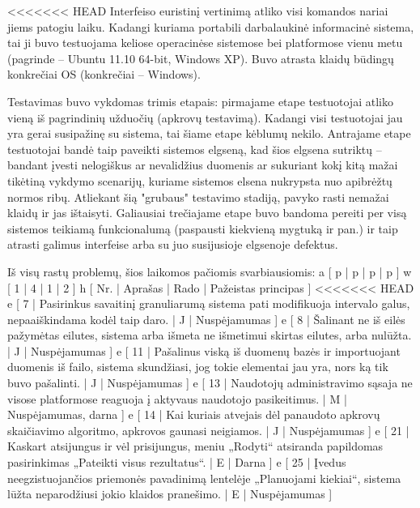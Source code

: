 <<<<<<< HEAD
Interfeiso euristinį vertinimą atliko visi komandos nariai jiems patogiu laiku.
Kadangi kuriama portabili darbalaukinė informacinė sistema, tai ji buvo testuojama
keliose operacinėse sistemose bei platformose vienu metu (pagrinde -- Ubuntu 11.10 64-bit,
Windows XP). Buvo atrasta klaidų būdingų konkrečiai OS (konkrečiai -- Windows).

Testavimas buvo vykdomas trimis etapais: pirmajame etape testuotojai atliko vieną iš
pagrindinių užduočių (apkrovų testavimą). Kadangi visi testuotojai jau yra gerai susipažinę
su sistema, tai šiame etape kėblumų nekilo. Antrajame etape testuotojai bandė taip paveikti
sistemos elgseną, kad šios elgsena sutriktų -- bandant įvesti nelogiškus ar nevalidžius duomenis
ar sukuriant kokį kitą mažai tikėtiną vykdymo scenarijų, kuriame sistemos elsena nukrypsta
nuo apibrėžtų normos ribų. Atliekant šią "grubaus" testavimo stadiją, pavyko rasti nemažai
klaidų ir jas ištaisyti. Galiausiai trečiajame etape buvo bandoma pereiti per visą sistemos
teikiamą funkcionalumą (paspausti kiekvieną mygtuką ir pan.) ir taip atrasti galimus
interfeise arba su juo susijusioje elgsenoje defektus.

Iš visų rastų problemų, šios laikomos pačiomis svarbiausiomis:
\xtableu
{
  a [ p | p | p | p ]
  w [ 1 | 4 | 1 | 2 ]
  h [ Nr. | Aprašas | Rado | Pažeistas principas ]
<<<<<<< HEAD
  e [  7  | Pasirinkus savaitinį granuliarumą sistema pati modifikuoja intervalo galus,
  nepaaiškindama kodėl taip daro. | J | Nuspėjamumas ]
  e [  8  | Šalinant ne iš eilės pažymėtas eilutes, sistema arba išmeta ne išmetimui
  skirtas eilutes, arba nulūžta.  | J | Nuspėjamumas ]
  e [ 11  | Pašalinus viską iš duomenų bazės ir importuojant duomenis iš failo,
  sistema skundžiasi, jog tokie elementai jau yra, nors ką tik buvo pašalinti. | J | Nuspėjamumas ]
  e [ 13  | Naudotojų administravimo sąsaja ne visose platformose reaguoja į
  aktyvaus naudotojo pasikeitimus. | M | Nuspėjamumas, darna ]
  e [ 14  | Kai kuriais atvejais dėl panaudoto apkrovų skaičiavimo algoritmo,
  apkrovos gaunasi neigiamos. | J | Nuspėjamumas ]
  e [ 21  | Kaskart atsijungus ir vėl prisijungus, meniu „Rodyti“ atsiranda papildomas
    pasirinkimas „Pateikti visus rezultatus“. | E | Darna ]
  e [ 25  | Įvedus neegzistuojančios priemonės pavadinimą lentelėje „Planuojami kiekiai“,
  sistema lūžta neparodžiusi jokio klaidos pranešimo. | E | Nuspėjamumas ]
}

